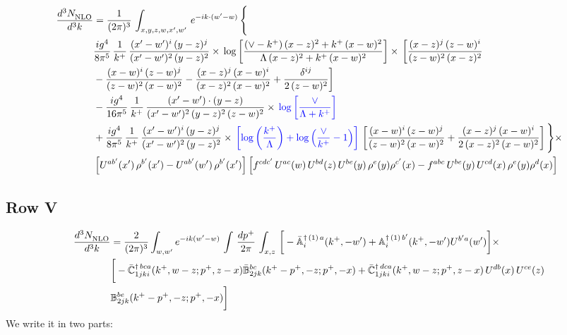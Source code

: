 \documentclass[9pt]{article}
\def\mf#1{\mathbb{#1}}
\numberwithin{equation}{section}
\begin{document}
\begin{align}
    \frac{d^{3}N_{\rm NLO}^{\rm}}{d^{3}k}  & =  \frac{1}{(2\pi)^{3}}\,
    \int_{x,y,z,w,x',w'}\,e^{-ik\cdot (w^\prime-w)}\,\Bigg\{\notag \\ & \frac{ig^{4}}{8\pi^{5}}\,\frac{1}{k^{+}}\,\frac{(x'-w')^{i}\,(y-z)^{j}}{(x'-w')^{2}\,(y-z)^{2}}\times\,\log{\left[\frac{(\vee-k^{+})\,(x-z)^{2}+k^{+}\,(x-w)^{2}}{\Lambda\, (x-z)^{2} + k^{+}\,(x-w)^{2}}\right]}\times\, \bigg[\frac{(x-z)^{j}\,(z-w)^{i}}{(z-w)^{2}\,(x-z)^{2}}\notag \\ & -\frac{(x-w)^{i}\,(z-w)^{j}}{(z-w)^{2}\,(x-w)^{2}}-\frac{(x-z)^{j}\,(x-w)^{i}}{(x-z)^{2}\,(x-w)^{2}}+\frac{\delta^{ij}}{2\,(z-w)^{2}}\bigg]\notag \\ & -\frac{ig^{4}}{16\pi^{5}}\,\frac{1}{k^{+}}\,\frac{(x'-w')\cdot (y-z)}{(x'-w')^{2}\,(y-z)^{2}\,(z-w)^{2}}\times\,{\color{blue}\log{\left[\frac{\vee}{\Lambda + k^{+}}\right]}}\notag \\ & + \frac{ig^{4}}{8\pi^{5}}\,\frac{1}{k^{+}}\,\frac{(x'-w')^{i}\,(y-z)^{j}}{(x'-w')^{2}\,(y-z)^{2}}\times\,{\color{blue}\left[\log{\left(\frac{k^{+}}{\Lambda}\right)}+\log{\left(\frac{\vee}{k^{+}}-1\right)}\right]}\,\left[\frac{(x-w)^{i}\,(z-w)^{j}}{(z-w)^{2}\,(x-w)^{2}}+\frac{(x-z)^{j}\,(x-w)^{i}}{2\, (x-z)^{2}\,(x-w)^{2}}\right] \Bigg\}\times\notag \\ &  \left[U^{ab'}(x')\,\rho^{b'}(x')-U^{ab'}(w')\,\rho^{b'}(x')\right] \left[f^{cdc'}\,U^{ac}(w)\,U^{bd}(z)\,U^{be}(y)\,\rho^{e}(y)\rho^{c'}(x)-f^{abc}\,U^{be}(y)\,U^{cd}(x)\,\rho^{e}(y)\rho^{d}(x)\right]
\end{align}
\subsection{Row V\,}
\begin{align}
    \frac{d^{3}N_{\rm NLO}^{\rm}}{d^{3}k}  & = \frac{2}{(2\pi)^{3}}  \int_{w, w^\prime} e^{-ik(w^\prime-w)}\, \int\, \frac{dp^{+}}{2\pi}\,\int_{x,z}\, \bigg[-\bar{\mf{A}}^{\dagger\,(1)\,a}_{i}(k^{+},-w^{\prime})+\mf{A}^{\dagger\, (1)\, b^{\prime}}_{i}(k^{+},-w^{\prime})U^{b^{\prime}a}(w^{\prime})\bigg]\times\notag \\ & \bigg[-\Bar{\mf{C}}^{\dagger\, bca}_{1jki}(k^{+},w-z;p^{+},z-x)\Bar{\mf{B}}^{bc}_{2jk}(k^{+}-p^{+},- z;p^{+},-x)+\bar{\mf{C}}^{\dagger\, dca}_{1jki}(k^+,w-z; p^+, z-x)\,U^{db}(x)\,U^{ce}(z) \notag \\ & {\mf{B}}^{be}_{2jk} (k^{+}-p^+, -z; p^+, -x) \bigg]\nonumber
\end{align}
We write it in two parts:
\end{document}
